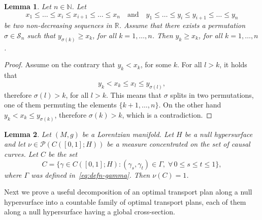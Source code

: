 \documentclass[12pt,a4paper]{amsart}
\theoremstyle{plain}
\newtheorem{lemma}{Lemma}[section]
\theoremstyle{definition}
\numberwithin{equation}{section}
\newcommand{\R}{\mathbb{R}}
\newcommand{\N}{\mathbb{N}}
\newcommand{\Prob}{\mathcal P}
\begin{document}
\begin{lemma}
\label{L:permutation}
    Let $n\in \N$. Let  
    $$x_1\leq\ldots\leq x_i\leq x_{i+1}\leq \dots \leq x_n \quad \text{and} \quad  y_1\leq\ldots\leq y_i\leq y_{i+1}\leq\ldots\leq y_n$$
    be two non-decreasing sequences in $\R$. 
    Assume that there exists a permutation $\sigma\in \mathcal{S}_n$ such that $y_{\sigma(k)}\geq x_k$,
    for all $k=1,\dots, n$.
    Then $y_k \geq x_k$, for all $k=1,\dots, n$.
\end{lemma}
\begin{proof}
    Assume on the contrary that $y_k< x_k$, for some $k$.
    For all $l> k$, it holds that
    \begin{equation}
         y_k
        < x_k
        \leq
        x_l
        \leq y_{\sigma(l)}
        ,
    \end{equation}
    therefore $\sigma(l)>k$, for all $l>k$.
    This means that $\sigma$ splits in two permutations, one of 
    them permuting the elements $\{k+1,\dots,n\}$.
    On the other hand $y_k<x_k\leq y_{\sigma(k)}$, therefore 
    $\sigma(k)>k$, which is a contradiction.
\end{proof}


\begin{lemma}
  \label{lem:structure-transport-plans}
Let $(M,g)$ be a Lorentzian manifold.
  Let $H$ be a null hypersurface  and let $\nu\in\Prob(C([0,1];H))$ be a
  measure concentrated on the set of causal curves.  
  Let $C$ be the set
  \begin{equation}
    C=\{\gamma\in C([0,1];H): (\gamma_s,\gamma_t)\in\Gamma,\; \forall\,
    0\leq s\leq t\leq1
    \},
  \end{equation}
  where $\Gamma$ was defined in~\eqref{eq:defn-gamma}.
  Then $\nu(C)=1$.
\end{lemma} 


Next we prove a useful decomposition of an optimal transport plan along
a null hypersurface into a countable family of optimal transport plans,
each of them along a null hypersurface having a global cross-section.
\end{document}
